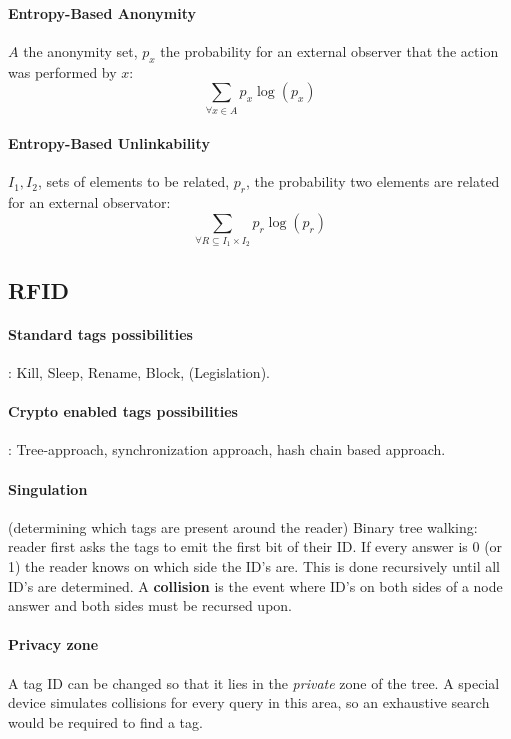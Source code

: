 \documentclass[6pt]{scrartcl}
\begin{document}
\begin{multicols}{4}
\paragraph{Entropy-Based Anonymity}
$A$ the anonymity set, $p_x$ the probability for an external observer that the action was performed by $x$:
\begin{equation*}
	\sum_{\forall x \in A} p_x \log(p_x)
\end{equation*}

\paragraph{Entropy-Based Unlinkability}
$I_1,I_2$, sets of elements to be related, $p_r$, the probability two elements are related for an external observator:
\begin{equation*}
	\sum_{\forall R \subseteq I_1 \times I_2}p_r \log(p_r)
\end{equation*}

\subsection{RFID}
\paragraph{Standard tags possibilities}: Kill, Sleep, Rename, Block, (Legislation).
\paragraph{Crypto enabled tags possibilities}: Tree-approach, synchronization approach, hash chain based approach.
\paragraph{Singulation} (determining which tags are present around the reader) Binary tree walking: reader first asks the tags to emit the first bit of their ID. If every answer is 0 (or 1) the reader knows on which side the ID's are. This is done recursively until all ID's are determined. A \textbf{collision} is the event where ID's on both sides of a node answer and both sides must be recursed upon.

\paragraph{Privacy zone} A tag ID can be changed so that it lies in the \emph{private} zone of the tree. A special device simulates collisions for every query in this area, so an exhaustive search would be required to find a tag. 


\end{multicols}
\end{document}
